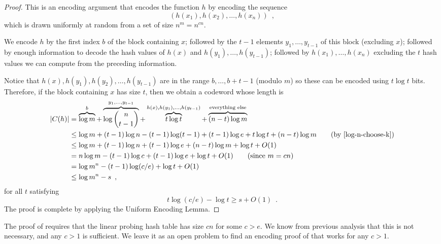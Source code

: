 \documentclass{patmorin}
\begin{document}
\begin{proof}
  This is an encoding argument that encodes the function $h$ by
  encoding the sequence
  \[
    (h(x_1),h(x_2),\ldots,h(x_n)) \enspace ,
  \]
  which is drawn uniformly at random from a set of size
  $n^{m}=n^{cn}$.
  
  We encode $h$ by the first index $b$ of the block containing $x$;
  followed by the $t-1$ elements $y_1,\ldots,y_{t-1}$ of this block
  (excluding $x$); followed by enough information to decode the hash
  values of $h(x)$ and $h(y_1),\ldots,h(y_{t-1})$; followed by
  $h(x_1),\ldots,h(x_n)$ excluding the $t$ hash values we can compute
  from the preceding information.

  Notice that $h(x),h(y_1),h(y_2),\ldots,h(y_{t-1})$ are in the range
  $b,\ldots,b+t-1$ (modulo $m$) so these can be encoded using
  $t\log t$ bits.  Therefore, if the block containing $x$ has size
  $t$, then we obtain a codeword whose length is
  \begin{align*}
    |C(h)| & = \overbrace{\log m}^{b} + \overbrace{\log\binom{n}{t-1}}^{y_1,\ldots,y_{t-1}} + \overbrace{t\log t}^{h(x),h(y_1),\ldots,h(y_{t-1})} + \overbrace{(n-t)\log m}^{\text{everything else}} \\
           & \le \log m + (t-1)\log n - 
             (t-1)\log(t-1) + (t-1)\log e + t\log t + (n-t)\log m \tag{by \eqref{log-n-choose-k}}\\
           & \le \log m + (t-1)\log n + (t-1)\log e + (n-t)\log m + \log t+ O(1)\\
           & = n\log m - (t-1)\log c + (t-1)\log e + \log t + O(1) \tag{since $m = cn$}\\
           & = \log m^n - (t-1)\log(c/e) + \log t + O(1) \\
           & \le \log m^n - s \enspace ,
  \end{align*}
  for all $t$ satisfying
  \[
    t \log (c/e) - \log t \ge s + O(1) \enspace .
  \]
  The proof is complete by applying the Uniform Encoding Lemma.
\end{proof}

\begin{rem}
  The proof of  requires that the linear
  probing hash table has size $cn$ for some $c>e$.  We know from
  previous analysis that this is not necessary, and any $c>1$ is
  sufficient. We leave it as an open problem to find an encoding proof
  of  that works for any $c>1$.
\end{rem}
\end{document}
